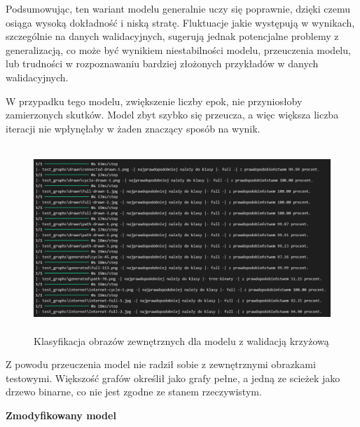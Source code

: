 Podsumowując, ten wariant modelu generalnie uczy się poprawnie, dzięki czemu osiąga wysoką dokładność i niską stratę.
Fluktuacje jakie występują w wynikach, szczególnie na danych walidacyjnych,
sugerują jednak potencjalne problemy z generalizacją, co może być wynikiem niestabilności modelu,
przeuczenia modelu, lub trudności w rozpoznawaniu bardziej złożonych przykładów w danych walidacyjnych.

W przypadku tego modelu, zwiększenie liczby epok, nie przyniosłoby zamierzonych skutków.
Model zbyt szybko się przeucza, a więc większa liczba iteracji nie wpłynęłaby w żaden znaczący sposób na wynik.

\begin{figure}[ht]
	\centering
	\includegraphics[height=7cm]{resources/tests/images/v3/crossvalid_txt.png}
	\caption{Klasyfikacja obrazów zewnętrznych dla modelu z walidacją krzyżową}
	\label{Fig:tests-cv-0b}
\end{figure}
\FloatBarrier

Z powodu przeuczenia model nie radził sobie z zewnętrznymi obrazkami testowymi.
Większość grafów określił jako grafy pełne, a jedną ze scieżek jako drzewo binarne,
co nie jest zgodne ze stanem rzeczywistym.

\textbf{Zmodyfikowany model}


